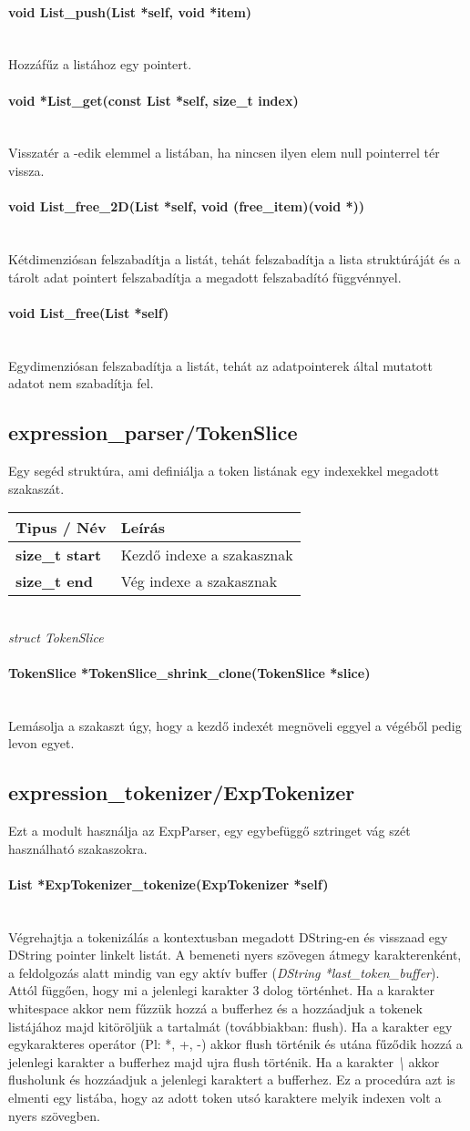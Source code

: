\documentclass{article}[12pt,a4paper]
\newcommand{\fn}[1]{\paragraph{#1}\mbox{}\\}
\begin{document}
    \fn{void List\_push(List *self, void *item)}
    Hozzáfűz a listához egy pointert.

    \fn{void *List\_get(const List *self, size\_t index)}
    Visszatér a -edik elemmel a listában, ha nincsen ilyen elem null pointerrel tér vissza.

    \fn{void List\_free\_2D(List *self, void (free\_item)(void *))}
    Kétdimenziósan felszabadítja a listát, tehát felszabadítja a lista struktúráját és a tárolt adat pointert felszabadítja a megadott felszabadító függvénnyel.

    \fn{void List\_free(List *self)}
    Egydimenziósan felszabadítja a listát, tehát az adatpointerek által mutatott adatot nem szabadítja fel.

    \subsection{expression\_parser/TokenSlice}
    Egy segéd struktúra, ami definiálja a token listának egy indexekkel megadott szakaszát.

    \begin{center}
        \begin{tabular}{ | p{5.5cm} || p{5.5cm} | }
            \hline
            \textbf{Tipus / Név} & Leírás \\
            \hline
            \textbf{size\_t start} & Kezdő indexe a szakasznak\\
            \hline
            \textbf{size\_t end} & Vég indexe a szakasznak \\
            \hline
        \end{tabular}\\
        \textit{struct TokenSlice}
    \end{center}

    \fn{TokenSlice *TokenSlice\_shrink\_clone(TokenSlice *slice)}
    Lemásolja a szakaszt úgy, hogy a kezdő indexét megnöveli eggyel a végéből pedig levon egyet.

    \subsection{expression\_tokenizer/ExpTokenizer}
    Ezt a modult használja az ExpParser, egy egybefüggő sztringet vág szét használható szakaszokra.

    \fn{List *ExpTokenizer\_tokenize(ExpTokenizer *self)}
    Végrehajtja a tokenizálás a kontextusban megadott DString-en és visszaad egy DString pointer linkelt listát.
    A bemeneti nyers szövegen átmegy karakterenként, a feldolgozás alatt mindig van egy aktív buffer (\textit{DString *last\_token\_buffer}).
    Attól függően, hogy mi a jelenlegi karakter 3 dolog történhet.
    Ha a karakter whitespace akkor nem fűzzük hozzá a bufferhez és a hozzáadjuk a tokenek listájához majd kitöröljük a tartalmát (továbbiakban: flush).
    Ha a karakter egy egykarakteres operátor (Pl: *, +, -) akkor flush történik és utána fűződik hozzá a jelenlegi karakter a bufferhez majd ujra flush történik.
    Ha a karakter \textit{\textbackslash} akkor flusholunk és hozzáadjuk a jelenlegi karaktert a bufferhez.
    Ez a procedúra azt is elmenti egy listába, hogy az adott token utsó karaktere melyik indexen volt a nyers szövegben.
\end{document}
